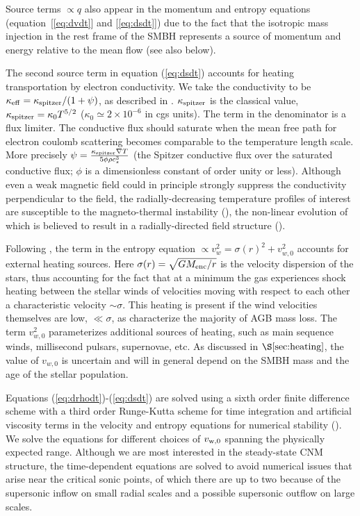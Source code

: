 \documentclass[usenatbib,fleqn]{mn2e}
\newcommand{\vw}{v_w}
\begin{document}
Source terms $\propto q$ also appear in the momentum and entropy
equations (equation~[\ref{eq:dvdt}] and [\ref{eq:dsdt}]) due to the fact
that the isotropic mass injection in the rest frame of the SMBH
represents a source of momentum and energy relative to the mean flow (see also below).  


The second source term in equation (\ref{eq:dsdt}) accounts for
heating transportation by electron conductivity. We take the
conductivity to be $\kappa_{\rm eff}=\kappa_{\rm spitzer}/(1+\psi)$,
as described in \citealt{DaltonBalbus:1993a}. $\kappa_{\rm spitzer}$
is the classical \citealt{Spitzer62} value, $\kappa_{\rm spitzer} =
\kappa_0 T^{5/2}$ ($\kappa_0\simeq 2\times 10^{-6}$ in cgs units). The
term in the denominator is a flux limiter. The conductive flux should
saturate when the mean free path for electron coulomb scattering
becomes comparable to the temperature length scale.  More precisely
$\psi=\frac{\kappa_{\rm spitzer} \nabla T}{5\phi \rho c_s^3}$ (the
Spitzer conductive flux over the saturated conductive flux; $\phi$ is
a dimensionless constant of order unity or less). Although even a weak
magnetic field could in principle strongly suppress the conductivity
perpendicular to the field, the radially-decreasing temperature
profiles of interest are susceptible to the magneto-thermal
instability (\citealt{Balbus01}), the non-linear evolution of which is
believed to result in a radially-directed field structure
(\citealt{Parrish&Stone07}).

Following \citet{ShcherbakovWong+:2014a}, the term in the entropy
equation $\propto \vw^2 = \sigma(r)^2+v_{w,0}^2$ accounts for external
heating sources.  Here $\sigma(r) = \sqrt{GM_{\rm enc}/r}$ is the
velocity dispersion of the stars, thus accounting for the fact that at
a minimum the gas experiences shock heating between the stellar winds
of velocities moving with respect to each other a characteristic
velocity $\sim \sigma$.  This heating is present if the wind
velocities themselves are low, $\ll \sigma$, as characterize the
majority of AGB mass loss.  The term $v_{w,0}^{2}$ parameterizes
additional sources of heating, such as main sequence winds,
millisecond pulsars, supernovae, etc.  As discussed in
$\S\ref{sec:heating}$, the value of $v_{w,0}$ is uncertain and will in
general depend on the SMBH mass and the age of the stellar population.

Equations (\ref{eq:drhodt})-(\ref{eq:dsdt}) are solved using a sixth
order finite difference scheme with a third order Runge-Kutta scheme
for time integration and artificial viscosity terms in the velocity
and entropy equations for numerical stability (\citealt{Brandenburg:2003a}).  We solve the equations for
different choices of $v_{\rm w,0}$ spanning the physically expected
range.  Although we are most interested in the steady-state CNM
structure, the time-dependent equations are solved to avoid numerical
issues that arise near the critical sonic points, of which there are
up to two because of the supersonic inflow on small radial scales and
a possible supersonic outflow on large scales.
\end{document}
